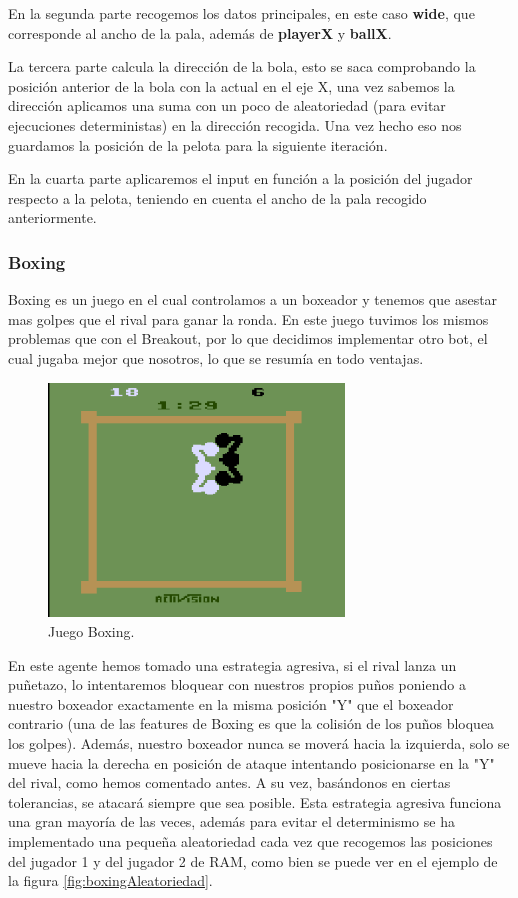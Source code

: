 En la segunda parte recogemos los datos principales, en este caso \textbf{wide}, que corresponde al ancho de la pala, además de \textbf{playerX} y \textbf{ballX}. 

La tercera parte calcula la dirección de la bola, esto se saca comprobando la posición anterior de la bola con la actual en el eje X, una vez sabemos la dirección aplicamos una suma con un poco de aleatoriedad (para evitar ejecuciones deterministas) en la dirección recogida. Una vez hecho eso nos guardamos la posición de la pelota para la siguiente iteración.

En la cuarta parte aplicaremos el input en función a la posición del jugador respecto a la pelota, teniendo en cuenta el ancho de la pala recogido anteriormente.

\subsubsection{Boxing}
\label{subsec:botsbasicos:boxing}
Boxing es un juego en el cual controlamos a un boxeador y tenemos que asestar mas golpes que el rival para ganar la ronda. En este juego tuvimos los mismos problemas que con el Breakout, por lo que decidimos implementar otro bot, el cual jugaba mejor que nosotros, lo que se resumía en todo ventajas.

\begin{figure}[h]
	\centering
	\includegraphics[width=0.7\textwidth]{Figures/boxing}
	\caption{Juego Boxing.}
	\label{fig:boxing}
\end{figure}

En este agente hemos tomado una estrategia agresiva, si el rival lanza un puñetazo, lo intentaremos bloquear con nuestros propios puños poniendo a nuestro boxeador exactamente en la misma posición "Y" que el boxeador contrario (una de las features de Boxing es que la colisión de los puños bloquea los golpes). Además, nuestro boxeador nunca se moverá hacia la izquierda, solo se mueve hacia la derecha en posición de ataque intentando posicionarse en la "Y" del rival, como hemos comentado antes. A su vez, basándonos en ciertas tolerancias, se atacará siempre que sea posible. Esta estrategia agresiva funciona una gran mayoría de las veces, además para evitar el determinismo se ha implementado una pequeña aleatoriedad cada vez que recogemos las posiciones del jugador 1 y del jugador 2 de RAM, como bien se puede ver en el ejemplo de la figura \ref{fig:boxingAleatoriedad}.


